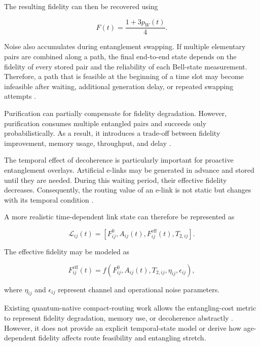 The resulting fidelity can then be recovered using

\begin{equation}
    F(t)
    =
    \frac{1+3p_W(t)}{4}.
\end{equation}

Noise also accumulates during entanglement swapping. If multiple elementary pairs are combined along a path, the final end-to-end state depends on the fidelity of every stored pair and the reliability of each Bell-state measurement. Therefore, a path that is feasible at the beginning of a time slot may become infeasible after waiting, additional generation delay, or repeated swapping attempts \cite{briegel1998quantum,pant2019routing}.

Purification can partially compensate for fidelity degradation. However, purification consumes multiple entangled pairs and succeeds only probabilistically. As a result, it introduces a trade-off between fidelity improvement, memory usage, throughput, and delay \cite{briegel1998quantum}.

The temporal effect of decoherence is particularly important for proactive entanglement overlays. Artificial e-links may be generated in advance and stored until they are needed. During this waiting period, their effective fidelity decreases. Consequently, the routing value of an e-link is not static but changes with its temporal condition \cite{caleffi2025quantumarchitecture,ercetin2026fidelityage,park2025quantum,chen2023adaptive}.

A more realistic time-dependent link state can therefore be represented as

\begin{equation}
    \mathcal{L}_{ij}(t)
    =
    \left[
    F_{ij}^{0},
    A_{ij}(t),
    F_{ij}^{\mathrm{eff}}(t),
    T_{2,ij}
    \right].
\end{equation}

The effective fidelity may be modeled as

\begin{equation}
    F_{ij}^{\mathrm{eff}}(t)
    =
    f
    \left(
    F_{ij}^{0},
    A_{ij}(t),
    T_{2,ij},
    \eta_{ij},
    \epsilon_{ij}
    \right),
\end{equation}

where $\eta_{ij}$ and $\epsilon_{ij}$ represent channel and operational noise parameters.

Existing quantum-native compact-routing work allows the entangling-cost metric to represent fidelity degradation, memory use, or decoherence abstractly \cite{caleffi2025quantumarchitecture}. However, it does not provide an explicit temporal-state model or derive how age-dependent fidelity affects route feasibility and entangling stretch.


